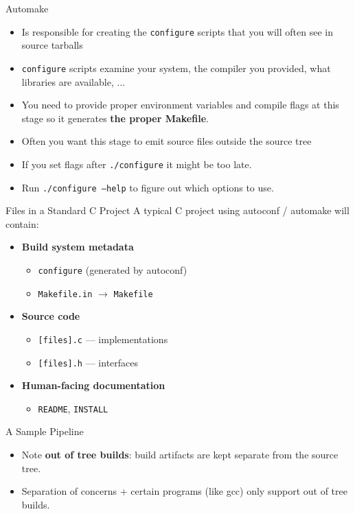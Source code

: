 \documentclass{../lecture}
\begin{document}
\begin{frame}[fragile]{Automake}
  \begin{itemize}
    \item Is responsible for creating the \texttt{configure} scripts that you
      will often see in source tarballs
    \item \texttt{configure} scripts examine your system, the compiler you
      provided, what libraries are available, ...
    \item You need to provide proper environment variables and compile flags at
      this stage so it generates \textbf{the proper Makefile}.
    \item Often you want this stage to emit source files outside the source tree
    \item If you set flags after \texttt{./configure} it might be too late.
    \item Run \texttt{./configure --help} to figure out which options to use.
  \end{itemize}
\end{frame}

\begin{frame}{Files in a Standard C Project}
  A typical C project using autoconf / automake will contain:
  \begin{itemize}
    \item \textbf{Build system metadata}
      \begin{itemize}
        \item \texttt{configure} (generated by autoconf)
        \item \texttt{Makefile.in} $\rightarrow$ \texttt{Makefile}
      \end{itemize}
    \item \textbf{Source code}
      \begin{itemize}
        \item \texttt{[files].c} — implementations
        \item \texttt{[files].h} — interfaces
      \end{itemize}
    \item \textbf{Human-facing documentation}
      \begin{itemize}
        \item \texttt{README}, \texttt{INSTALL}
      \end{itemize}
  \end{itemize}
\end{frame}

\begin{frame}[fragile]{A Sample Pipeline}

\begin{itemize}
  \item Note \textbf{out of tree builds}: build artifacts are kept separate from
    the source tree.
  \item Separation of concerns + certain programs (like gcc) only support out of
    tree builds.
\end{itemize}
\end{frame}
\end{document}
